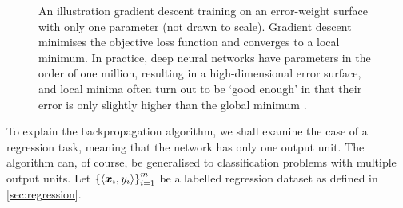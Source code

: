 \documentclass[../main.tex]{subfiles}
\begin{document}
\begin{figure}
    \centering
    \caption[An illustration gradient descent training on an error-weight surface.]{An illustration gradient descent training on an error-weight surface with only one parameter (not drawn to scale). Gradient descent minimises the objective loss function and converges to a local minimum. In practice, deep neural networks have parameters in the order of one million, resulting in a high-dimensional error surface, and local minima often turn out to be `good enough' in that their error is only slightly higher than the global minimum \cite{lecun2015}.}
    \label{fig:gradient_descent_local_minimum}
\end{figure}

To explain the backpropagation algorithm, we shall examine the case of a regression task, meaning that the network has only one output unit.
The algorithm can, of course, be generalised to classification problems with multiple output units.
Let $\left\{\langle {\bm{x}}_i, y_i \rangle \right\}_{i=1}^m$ be a labelled regression dataset as defined in \cref{sec:regression}.
\end{document}
